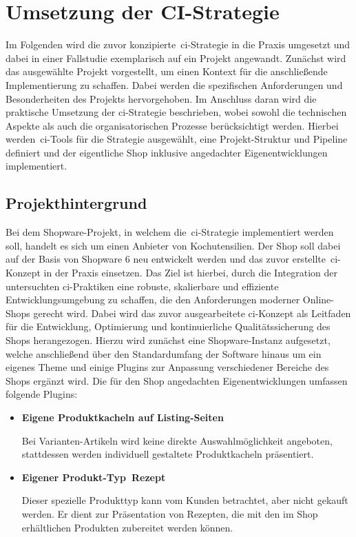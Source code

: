 
\section{Umsetzung der CI-Strategie} \label{sec:04-implementation}

Im Folgenden wird die zuvor konzipierte\ \acrshort{ci}-Strategie in die Praxis umgesetzt und dabei in einer Fallstudie
exemplarisch auf ein Projekt angewandt.
Zunächst wird das ausgewählte Projekt vorgestellt, um einen Kontext für die anschließende Implementierung zu schaffen.
Dabei werden die spezifischen Anforderungen und Besonderheiten des Projekts hervorgehoben.
Im Anschluss daran wird die praktische Umsetzung der \acrshort{ci}-Strategie beschrieben, wobei sowohl die technischen
Aspekte als auch die organisatorischen Prozesse berücksichtigt werden.
Hierbei werden\ \acrshort{ci}-Tools für die Strategie ausgewählt, eine Projekt-Struktur und Pipeline definiert und
der eigentliche Shop inklusive angedachter Eigenentwicklungen implementiert.

\subsection{Projekthintergrund} \label{subsec:04-implementation-1}

Bei dem Shopware-Projekt, in welchem die\ \acrshort{ci}-Strategie implementiert werden soll, handelt es sich um einen
Anbieter von Kochutensilien.
Der Shop soll dabei auf der Basis von Shopware 6 neu entwickelt werden und das zuvor erstellte\ \acrshort{ci}-Konzept
in der Praxis einsetzen.
Das Ziel ist hierbei, durch die Integration der untersuchten \acrshort{ci}-Praktiken eine robuste, skalierbare und
effiziente Entwicklungsumgebung zu schaffen, die den Anforderungen moderner Online-Shops gerecht wird.
Dabei wird das zuvor ausgearbeitete \acrshort{ci}-Konzept als Leitfaden für die Entwicklung, Optimierung und
kontinuierliche Qualitätssicherung des Shops herangezogen.
Hierzu wird zunächst eine Shopware-Instanz aufgesetzt, welche anschließend über den Standardumfang der Software hinaus
um ein eigenes Theme und einige Plugins zur Anpassung verschiedener Bereiche des Shops ergänzt wird.
Die für den Shop angedachten Eigenentwicklungen umfassen folgende Plugins:

\begin{itemize}
    \item {
        \textbf{Eigene Produktkacheln auf Listing-Seiten}\par
        Bei Varianten-Artikeln wird keine direkte Auswahlmöglichkeit angeboten, stattdessen werden individuell
        gestaltete Produktkacheln präsentiert.
    }

    \item {
        \textbf{Eigener Produkt-Typ\ \glqq Rezept\grqq}\par
        Dieser spezielle Produkttyp kann vom Kunden betrachtet, aber nicht gekauft werden.
        Er dient zur Präsentation von Rezepten, die mit den im Shop erhältlichen Produkten zubereitet werden können.
    }
\end{itemize}


